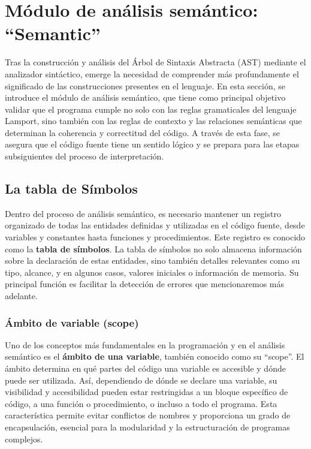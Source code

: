 \newpage

\section{Módulo de análisis semántico: ``Semantic''}\label{sec:implementacionSemantic}
Tras la construcción y análisis del Árbol de Sintaxis Abstracta (AST) mediante el analizador sintáctico, emerge la necesidad de comprender más profundamente el significado de las construcciones presentes en el lenguaje. En esta sección, se introduce el módulo de análisis semántico, que tiene como principal objetivo validar que el programa cumple no solo con las reglas gramaticales del lenguaje Lamport, sino también con las reglas de contexto y las relaciones semánticas que determinan la coherencia y correctitud del código. A través de esta fase, se asegura que el código fuente tiene un sentido lógico y se prepara para las etapas subsiguientes del proceso de interpretación.

\subsection{La tabla de Símbolos}
Dentro del proceso de análisis semántico, es necesario mantener un registro organizado de todas las entidades definidas y utilizadas en el código fuente, desde variables y constantes hasta funciones y procedimientos. Este registro es conocido como la \textbf{tabla de símbolos}. La tabla de símbolos no solo almacena información sobre la declaración de estas entidades, sino también detalles relevantes como su tipo, alcance, y en algunos casos, valores iniciales o información de memoria. Su principal función es facilitar la detección de errores que mencionaremos más adelante.

\subsubsection{Ámbito de variable (scope)}
Uno de los conceptos más fundamentales en la programación y en el análisis semántico es el \textbf{ámbito de una variable}, también conocido como su ``scope''. El ámbito determina en qué partes del código una variable es accesible y dónde puede ser utilizada. Así, dependiendo de dónde se declare una variable, su visibilidad y accesibilidad pueden estar restringidas a un bloque específico de código, a una función o procedimiento, o incluso a todo el programa. Esta característica permite evitar conflictos de nombres y proporciona un grado de encapsulación, esencial para la modularidad y la estructuración de programas complejos.



